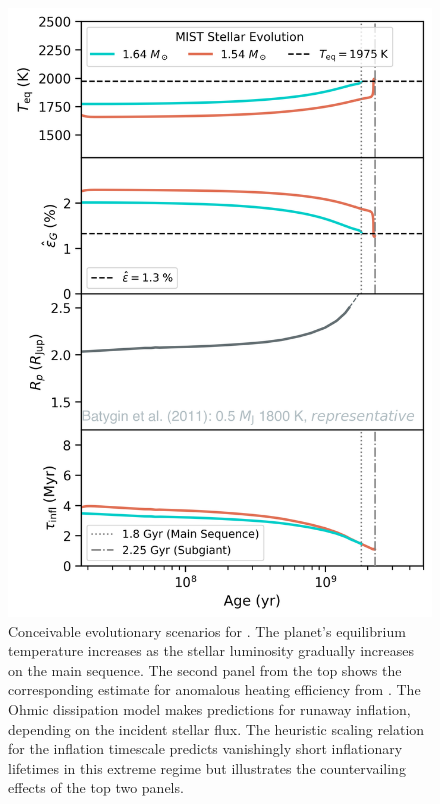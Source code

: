 \documentclass[linenumbers, twocolumn, trackchanges]{aastex631}
\newcommand{\hatpb}{\object{HAT-P-67 b}}
\begin{document}
\begin{figure}
  \includegraphics[width=\linewidth]{reinflation_MIST2.png}
  \caption{Conceivable evolutionary scenarios for \hatpb.  The planet's equilibrium temperature increases as the stellar luminosity gradually increases on the main sequence.  The second panel from the top shows the corresponding estimate for anomalous heating efficiency from \citet{2018AJ....155..214T}. The Ohmic dissipation model makes predictions for runaway inflation, depending on the incident stellar flux.  The heuristic scaling relation for the inflation timescale predicts vanishingly short inflationary lifetimes in this extreme regime but illustrates the countervailing effects of the top two panels.}
  \label{fig:OhmicInflate}
\end{figure}
\end{document}

